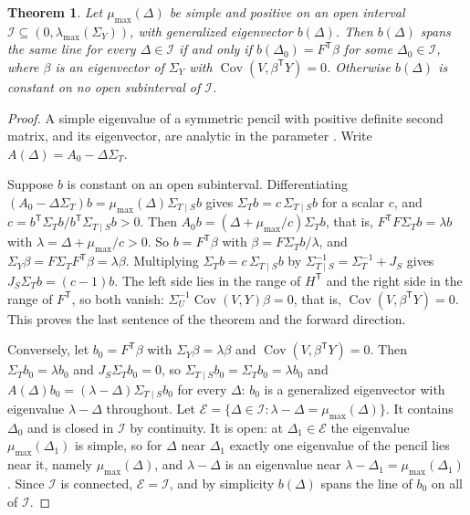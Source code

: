 \documentclass[11pt,onecolumn]{IEEEtran}
\newtheorem{theorem}{Theorem}
\newcommand{\Cov}{\operatorname{Cov}}
\begin{document}
\begin{theorem}\label{thm:turning}
Let $\mu_{\max}(\Delta)$ be simple and positive on an open interval
$\mathcal I\subseteq(0,\lambda_{\max}(\Sigma_Y))$, with generalized eigenvector $b(\Delta)$. Then $b(\Delta)$
spans the same line for every $\Delta\in\mathcal I$ if and only if
$b(\Delta_0)=F^{\mathsf T}\beta$ for some $\Delta_0\in\mathcal I$, where
$\beta$ is an eigenvector of $\Sigma_Y$ with $\Cov(V,\beta^{\mathsf T}Y)=0$.
Otherwise $b(\Delta)$ is constant on no open subinterval of $\mathcal I$.
\end{theorem}

\begin{proof}
A simple eigenvalue of a symmetric pencil with positive definite second
matrix, and its eigenvector, are analytic in the parameter
\cite{kato1995}. Write $A(\Delta)=A_0-\Delta\Sigma_T$.

Suppose $b$ is constant on an open subinterval. Differentiating
$(A_0-\Delta\Sigma_T)b=\mu_{\max}(\Delta)\Sigma_{T\mid S}b$ gives
$\Sigma_Tb=c\,\Sigma_{T\mid S}b$ for a scalar $c$, and
$c=b^{\mathsf T}\Sigma_Tb/b^{\mathsf T}\Sigma_{T\mid S}b>0$. Then
$A_0b=(\Delta+\mu_{\max}/c)\Sigma_Tb$, that is,
$F^{\mathsf T}F\Sigma_Tb=\lambda b$ with $\lambda=\Delta+\mu_{\max}/c>0$.
So $b=F^{\mathsf T}\beta$ with $\beta=F\Sigma_Tb/\lambda$, and
$\Sigma_Y\beta=F\Sigma_TF^{\mathsf T}\beta=\lambda\beta$. Multiplying
$\Sigma_Tb=c\,\Sigma_{T\mid S}b$ by
$\Sigma_{T\mid S}^{-1}=\Sigma_T^{-1}+J_S$ gives $J_S\Sigma_Tb=(c-1)b$. The
left side lies in the range of $H^{\mathsf T}$ and the right side in the
range of $F^{\mathsf T}$, so both vanish:
$\Sigma_U^{-1}\Cov(V,Y)\beta=0$, that is, $\Cov(V,\beta^{\mathsf T}Y)=0$.
This proves the last sentence of the theorem and the forward direction.

Conversely, let $b_0=F^{\mathsf T}\beta$ with $\Sigma_Y\beta=\lambda\beta$
and $\Cov(V,\beta^{\mathsf T}Y)=0$. Then $\Sigma_Tb_0=\lambda b_0$ and
$J_S\Sigma_Tb_0=0$, so $\Sigma_{T\mid S}b_0=\Sigma_Tb_0=\lambda b_0$ and
$A(\Delta)b_0=(\lambda-\Delta)\Sigma_{T\mid S}b_0$ for every $\Delta$: $b_0$
is a generalized eigenvector with eigenvalue $\lambda-\Delta$ throughout.
Let $\mathcal E=\{\Delta\in\mathcal I:\lambda-\Delta=\mu_{\max}(\Delta)\}$.
It contains $\Delta_0$ and is closed in $\mathcal I$ by continuity. It is
open: at $\Delta_1\in\mathcal E$ the eigenvalue $\mu_{\max}(\Delta_1)$ is
simple, so for $\Delta$ near $\Delta_1$ exactly one eigenvalue of the
pencil lies near it, namely $\mu_{\max}(\Delta)$, and $\lambda-\Delta$ is an
eigenvalue near $\lambda-\Delta_1=\mu_{\max}(\Delta_1)$. Since
$\mathcal I$ is connected, $\mathcal E=\mathcal I$, and by simplicity
$b(\Delta)$ spans the line of $b_0$ on all of $\mathcal I$.
\end{proof}
\end{document}
